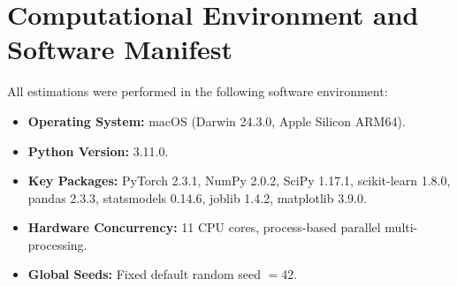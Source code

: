 \documentclass[12pt]{article}
\begin{document}
\section{Computational Environment and Software Manifest}
\label{app:comp_env}

All estimations were performed in the following software environment:
\begin{itemize}
    \item \textbf{Operating System:} macOS (Darwin 24.3.0, Apple Silicon ARM64).
    \item \textbf{Python Version:} 3.11.0.
    \item \textbf{Key Packages:} PyTorch 2.3.1, NumPy 2.0.2, SciPy 1.17.1, scikit-learn 1.8.0, pandas 2.3.3, statsmodels 0.14.6, joblib 1.4.2, matplotlib 3.9.0.
    \item \textbf{Hardware Concurrency:} 11 CPU cores, process-based parallel multi-processing.
    \item \textbf{Global Seeds:} Fixed default random seed $= 42$.
\end{itemize}
\end{document}
